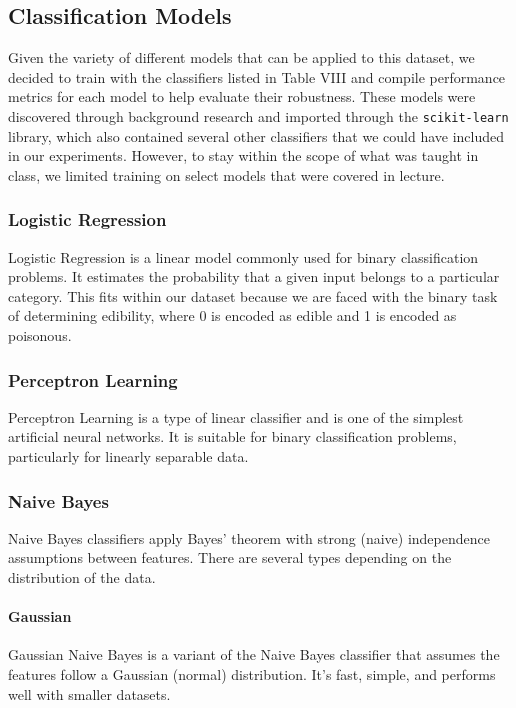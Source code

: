 \documentclass[11pt, conference]{IEEEtran}
\begin{document}
    \subsection{Classification Models}
    Given the variety of different models that can be applied to this dataset, we decided to train with the classifiers listed in Table VIII and compile performance metrics for each model to help evaluate their robustness. These models were discovered through background research and imported through the \texttt{scikit-learn} library, which also contained several other classifiers that we could have included in our experiments. However, to stay within the scope of what was taught in class, we limited training on select models that were covered in lecture. 
    
        \subsubsection{Logistic Regression}
        Logistic Regression is a linear model commonly used for binary classification problems. It estimates the probability that a given input belongs to a particular category. This fits within our dataset because we are faced with the binary task of determining edibility, where 0 is encoded as edible and 1 is encoded as poisonous.

        \subsubsection{Perceptron Learning}
        Perceptron Learning is a type of linear classifier and is one of the simplest artificial neural networks. It is suitable for binary classification problems, particularly for linearly separable data.

        \subsubsection{Naive Bayes}
        Naive Bayes classifiers apply Bayes' theorem with strong (naive) independence assumptions between features. There are several types depending on the distribution of the data.
            \paragraph{Gaussian}
            Gaussian Naive Bayes is a variant of the Naive Bayes classifier that assumes the features follow a Gaussian (normal) distribution. It's fast, simple, and performs well with smaller datasets.
\end{document}
